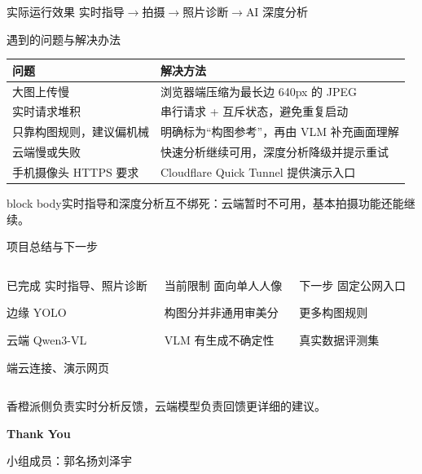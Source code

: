 \documentclass[aspectratio=169,11pt]{beamer}
\newcommand{\takeaway}[1]{\vspace{0.2cm}\begin{beamercolorbox}[sep=0.13cm,wd=\linewidth]{block body}\centering\small\color{accent}#1\end{beamercolorbox}}
\begin{document}
\begin{frame}{实际运行效果}
\vspace{1.1cm}
\centering\Large\color{accent}
实时指导\quad $\rightarrow$\quad 拍摄\quad $\rightarrow$\quad 照片诊断\quad $\rightarrow$\quad AI 深度分析
\vfill
\end{frame}

\begin{frame}{遇到的问题与解决办法}
\renewcommand{\arraystretch}{1.65}
\small
\begin{tabularx}{\linewidth}{@{}p{3.5cm}X@{}}
\toprule
\textbf{问题} & \textbf{解决方法}\\
\midrule
大图上传慢 & 浏览器端压缩为最长边 640px 的 JPEG\\
实时请求堆积 & 串行请求 + 互斥状态，避免重复启动\\
只靠构图规则，建议偏机械 & 明确标为“构图参考”，再由 VLM 补充画面理解\\
云端慢或失败 & 快速分析继续可用，深度分析降级并提示重试\\
手机摄像头 HTTPS 要求 & Cloudflare Quick Tunnel 提供演示入口\\
\bottomrule
\end{tabularx}
\vspace{0.3cm}
\takeaway{实时指导和深度分析互不绑死：云端暂时不可用，基本拍摄功能还能继续。}
\end{frame}

\begin{frame}{项目总结与下一步}
\begin{columns}[T,onlytextwidth]
\begin{block}{已完成}
\small
实时指导、照片诊断\par
边缘 YOLO\par
云端 Qwen3-VL\par
端云连接、演示网页
\end{block}
\begin{block}{当前限制}
\small
面向单人人像\par
构图分并非通用审美分\par
VLM 有生成不确定性
\end{block}
\begin{block}{下一步}
\small
固定公网入口\par
更多构图规则\par
真实数据评测集
\end{block}
\end{columns}
\vspace{0.65cm}
\centering\large\color{accent}香橙派侧负责实时分析反馈，云端模型负责回馈更详细的建议。
\end{frame}

\begin{frame}
\vfill
\begin{center}
    {\Huge \textbf{Thank You}}

    \vspace{1.8cm}

    {\small 小组成员：郭名扬\quad 刘泽宇\par}
\end{center}
\end{frame}
\end{document}

